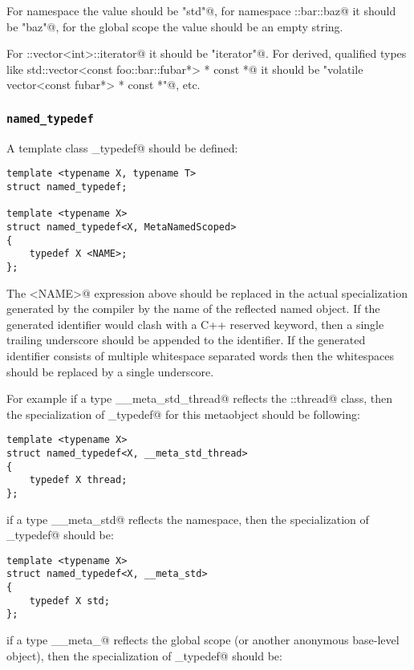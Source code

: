 For namespace \verb@std@ the value should be \verb@"std"@, for namespace
\verb@foo::bar::baz@ it should be \verb@"baz"@, for the global scope the
value should be an empty string.

For \verb@std::vector<int>::iterator@ it should be \verb@"iterator"@. For derived,
qualified types like \verb@volatile std::vector<const foo::bar::fubar*> * const *@
it should be \verb@"volatile vector<const fubar*> * const *"@, etc.


\subsubsection{\texttt{named\_typedef}}

A template class \verb@named_typedef@ should be defined:

\begin{verbatim}
template <typename X, typename T>
struct named_typedef;

template <typename X>
struct named_typedef<X, MetaNamedScoped>
{
	typedef X <NAME>;
};
\end{verbatim}

The \verb@<NAME>@ expression above should be replaced in the actual specialization generated by the compiler
by the name of the reflected named object. If the generated identifier would clash with a C++
reserved keyword, then a single trailing underscore should be appended to the identifier.
If the generated identifier consists of multiple whitespace separated words then the whitespaces
should be replaced by a single underscore.

For example if a type \verb@__meta_std_thread@
reflects the \verb@std::thread@ class, then the specialization of \verb@named_typedef@
for this metaobject should be following:

\begin{verbatim}
template <typename X>
struct named_typedef<X, __meta_std_thread>
{
	typedef X thread;
};
\end{verbatim}

if a type \verb@__meta_std@ reflects the \verb@std@ namespace, then the specialization of \verb@named_typedef@
should be:

\begin{verbatim}
template <typename X>
struct named_typedef<X, __meta_std>
{
	typedef X std;
};
\end{verbatim}

if a type \verb@__meta_@ reflects the global scope (or another anonymous base-level object),
then the specialization of \verb@named_typedef@ should be:

